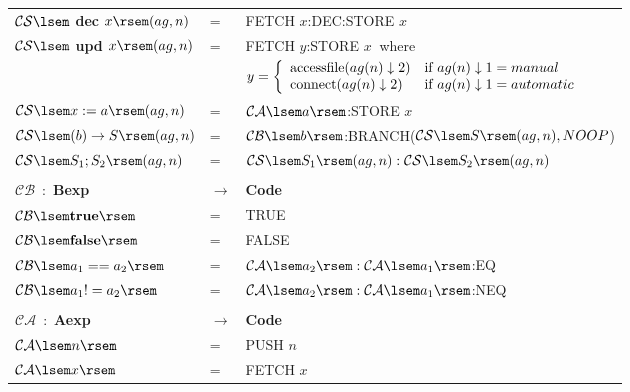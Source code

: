\documentclass[preprint, prX]{revtex4}
\begin{document}
\begin{table}[!htb]
\begin{center}
\begin{tabular}{ | l  l  l | }
  $\mathcal{CS} \lsem$ \textbf{dec} $x \rsem (ag,n)$ & = & FETCH $x$:DEC:STORE $x$ \\
  $\mathcal{CS} \lsem$ \textbf{upd} $x \rsem (ag,n)$ & = & FETCH $y$:STORE $x\ $ where \\ & & $y = \left\{\begin{array}{l l}
  \textnormal{accessfile}(ag(n)\downarrow 2) & \textnormal{if}\ ag(n)\downarrow 1 = manual \\
  \textnormal{connect}(ag(n)\downarrow 2) & \textnormal{if}\ ag(n)\downarrow 1 = automatic \\
  \end{array}\right.$ \\
  $\mathcal{CS} \lsem x := a \rsem(ag,n)$ & = & $\mathcal{CA}\lsem a\rsem$:STORE $x$ \\
  $\mathcal{CS} \lsem (b)\rightarrow S \rsem(ag,n)$ & = & $\mathcal{CB} \lsem b\rsem$:BRANCH($\mathcal{CS}\lsem S\rsem (ag,n),NOOP$)\\ $\mathcal{CS} \lsem S_{1};S_{2} \rsem(ag,n)$ & = &
  $\mathcal{CS}\lsem S_{1}\rsem(ag,n):\mathcal{CS}\lsem S_{2}\rsem (ag,n)$ \\
  & & \\
  $\mathcal{CB}$~:~\textbf{Bexp} & $\rightarrow$ & \textbf{Code} \\
  $\mathcal{CB} \lsem \textbf{true} \rsem $ & = & TRUE \\
  $\mathcal{CB} \lsem \textbf{false} \rsem $ & = & FALSE \\
  $\mathcal{CB} \lsem a_{1}==a_{2} \rsem$ & = & $\mathcal{CA} \lsem a_{2}\rsem:\mathcal{CA} \lsem a_{1}\rsem$:EQ \\
  $\mathcal{CB} \lsem a_{1}!=a_{2} \rsem$ & = & $\mathcal{CA} \lsem a_{2}\rsem:\mathcal{CA} \lsem a_{1}\rsem$:NEQ \\
  & & \\
  $\mathcal{CA}$~:~\textbf{Aexp} & $\rightarrow$ & \textbf{Code} \\
  $\mathcal{CA} \lsem n \rsem$ & = & PUSH $n$ \\
  $\mathcal{CA}\lsem x \rsem$ & = & FETCH $x$ \\
\hline
\end{tabular}
\end{center}
\normalsize
\vspace{-5mm}
\end{table}
\end{document}
